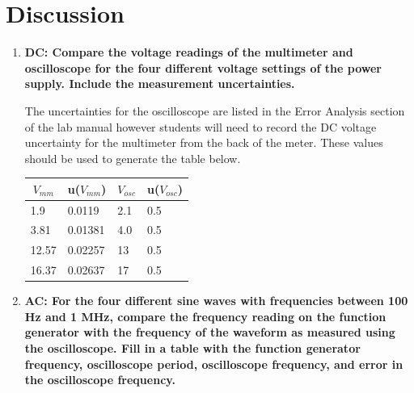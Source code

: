 \section{Discussion}
\begin{enumerate}[resume]

\item {\bf DC: Compare the voltage readings of the multimeter and oscilloscope for the four different voltage settings of the power supply. Include the measurement uncertainties.}\newline

The uncertainties for the oscilloscope are listed in the Error Analysis section of the lab manual however students will need to record the DC voltage uncertainty for the multimeter from the back of the meter. These values should be used to generate the table below.

\begin{table}[ht]
\center
\begin{tabular}{|l|l|l|l|}
\hline
\multicolumn{1}{|c|}{$V_{mm}$} & \multicolumn{1}{c|}{u($V_{mm}$)} & \multicolumn{1}{c|}{$V_{osc}$} & \multicolumn{1}{c|}{u($V_{osc}$)} \\ \hline
1.9                            & 0.0119                           & 2.1                            & 0.5                               \\ \hline
3.81                           & 0.01381                          & 4.0                            & 0.5                               \\ \hline
12.57                          & 0.02257                          & 13                             & 0.5                               \\ \hline
16.37                          & 0.02637                          & 17                             & 0.5                               \\ \hline
\end{tabular}
\label{tab:accg9}
\end{table}


\item {\bf AC: For the four different sine waves with frequencies between 100 Hz and 1 MHz, compare the frequency reading on the function generator with the frequency of the waveform as measured using the oscilloscope. Fill in a table with the function generator frequency, oscilloscope period, oscilloscope frequency, and error in the oscilloscope frequency.}\newline


\end{enumerate}
